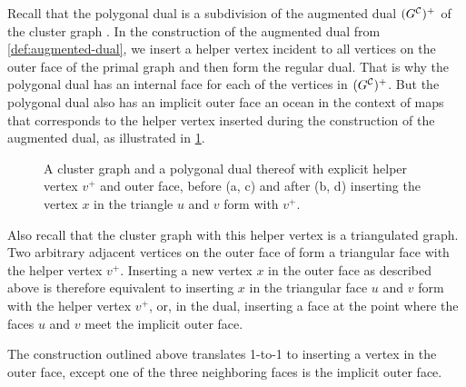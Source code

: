 Recall that the polygonal dual is a subdivision of the augmented dual $(G^\mathcal{C}_{})^+$ of the cluster graph \clustergraph{}.
In the construction of the augmented dual from \cref{def:augmented-dual}, we insert a helper vertex incident to all vertices on the outer face of the primal graph and then form the regular dual.
That is why the polygonal dual has an internal face for each of the vertices in $(G^\mathcal{C}_{})^+$.
But the polygonal dual also has an implicit outer face \emdash{} an ocean in the context of maps \emdash{} that corresponds to the helper vertex inserted during the construction of the augmented dual, as illustrated in \cref{fig:insert-vertex-duality}.

\begin{figure}[H]
	\centering
	\quad
	\qquad
	\quad
	\caption{A cluster graph and a polygonal dual thereof with explicit helper vertex $v^+$ and outer face, before (a, c) and after (b, d) inserting the vertex $x$ in the triangle $u$ and $v$ form with $v^+$.}
	\label{fig:insert-vertex-duality}
\end{figure}

Also recall that the cluster graph with this helper vertex is a triangulated graph.
Two arbitrary adjacent vertices on the outer face of \clustergraph{} form a triangular face with the helper vertex $v^+$.
Inserting a new vertex $x$ in the outer face as described above is therefore equivalent to inserting $x$ in the triangular face $u$ and $v$ form with the helper vertex $v^+$, or, in the dual, inserting a face at the point where the faces $u$ and $v$ meet the implicit outer face.

The construction outlined above translates 1-to-1 to inserting a vertex in the outer face, except one of the three neighboring faces is the implicit outer face.
